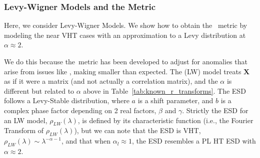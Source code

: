 %
%
%


\subsubsection{Levy-Wigner Models and the \ALPHAHAT Metric}

Here, we consider Levy-Wigner Models.
We show how to obtain the \WW~\ALPHAHAT metric by modeling the near VHT cases with an approximation to a Levy distribution at $\alpha\approx 2$.  

We do this because the~\ALPHAHAT metric has been developed to adjust for \SCALE anomalies that arise from issues like \CorrelationTraps,
making \ALPHA smaller than expected.
The  \LevyWigner (LW) model treats  $\mathbf{X}$ as if it were a \Wigner matrix (and not actually a correlation  matrix), and the $\alpha$ is different but related to $\alpha$ above in Table~\ref{tab:known_r_transforms}.
The ESD follows a Levy-Stable distribution, where $a$ is a shift parameter, and $b$ is a complex phase factor depending on 2 real factors, $\beta$ and $\gamma$.
Strictly the ESD for an LW model, $\rho_{LW}(\lambda)$, is defined by its characteristic function (i.e., the Fourier Transform of $\rho_{LW}(\lambda)$), but
we can note that the ESD is VHT, $\rho_{LW}(\lambda)\sim\lambda^{-\alpha-1}$, and that when $\alpha_{l}\approx 1$, the ESD resembles a PL HT ESD with $\alpha\approx 2$.

